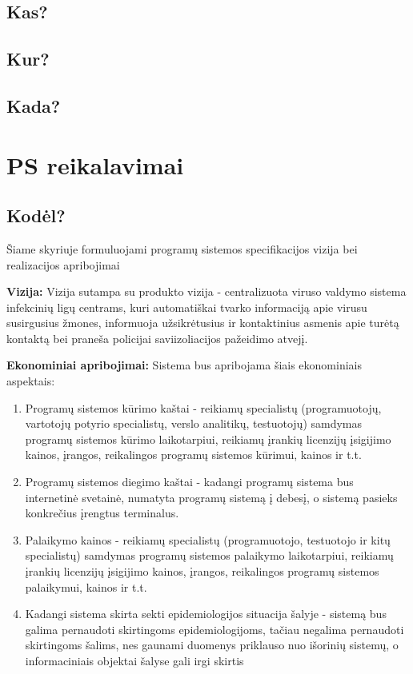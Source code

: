 \documentclass{VUMIFPSkursinis}
\begin{document}
\subsection{Kas?}\label{sec:ISReqWho}
\subsection{Kur?}\label{sec:ISReqWhere}
\subsection{Kada?}\label{sec:ISReqWhen}

\section{PS reikalavimai}
 
\subsection{Kodėl?}\label{sec:PSReqWhy}
Šiame skyriuje formuluojami programų sistemos specifikacijos vizija bei realizacijos apribojimai

\textbf{Vizija:} Vizija sutampa su produkto vizija - centralizuota viruso valdymo sistema infekcinių ligų centrams, kuri automatiškai tvarko informaciją apie virusu susirgusius žmones, informuoja užsikrėtusius ir kontaktinius asmenis apie turėtą kontaktą bei praneša policijai saviizoliacijos pažeidimo atvejį.


\textbf{Ekonominiai apribojimai:}
Sistema bus apribojama šiais ekonominiais aspektais:
	\begin{enumerate}
		\item Programų sistemos kūrimo kaštai - reikiamų specialistų (programuotojų, vartotojų potyrio specialistų, verslo analitikų, testuotojų) samdymas programų sistemos kūrimo laikotarpiui, reikiamų įrankių licenzijų įsigijimo kainos, įrangos, reikalingos programų sistemos kūrimui, kainos ir t.t. 
		\item Programų sistemos diegimo kaštai - kadangi programų sistema bus internetinė svetainė, numatyta programų sistemą į debesį, o sistemą pasieks konkrečius įrengtus terminalus.
		\item Palaikymo kainos - reikiamų specialistų (programuotojo, testuotojo ir kitų specialistų) samdymas programų sistemos palaikymo laikotarpiui, reikiamų įrankių licenzijų įsigijimo kainos, įrangos, reikalingos programų sistemos palaikymui, kainos ir t.t.
		\item Kadangi sistema skirta sekti epidemiologijos situacija šalyje - sistemą bus galima pernaudoti skirtingoms epidemiologijoms, tačiau negalima pernaudoti skirtingoms šalims, nes gaunami duomenys priklauso nuo išorinių sistemų, o informaciniais objektai šalyse gali irgi skirtis 
	\end{enumerate}
\end{document}
